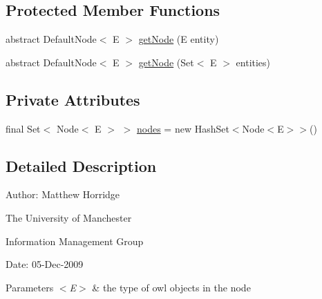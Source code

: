 \subsection*{Protected Member Functions}
\begin{DoxyCompactItemize}
\item 
abstract Default\-Node$<$ E $>$ \hyperlink{classorg_1_1semanticweb_1_1owlapi_1_1reasoner_1_1impl_1_1_default_node_set_3_01_e_01extends_01_o_w_l_object_01_4_a8f6b2885eac9afbc78bcea792bcda134}{get\-Node} (E entity)
\item 
abstract Default\-Node$<$ E $>$ \hyperlink{classorg_1_1semanticweb_1_1owlapi_1_1reasoner_1_1impl_1_1_default_node_set_3_01_e_01extends_01_o_w_l_object_01_4_ab78b1ad730667f015d372c462a029863}{get\-Node} (Set$<$ E $>$ entities)
\end{DoxyCompactItemize}
\subsection*{Private Attributes}
\begin{DoxyCompactItemize}
\item 
final Set$<$ Node$<$ E $>$ $>$ \hyperlink{classorg_1_1semanticweb_1_1owlapi_1_1reasoner_1_1impl_1_1_default_node_set_3_01_e_01extends_01_o_w_l_object_01_4_ab355a8f9ba4d122cad825fd36214893e}{nodes} = new Hash\-Set$<$Node$<$E$>$$>$()
\end{DoxyCompactItemize}


\subsection{Detailed Description}
Author\-: Matthew Horridge\par
 The University of Manchester\par
 Information Management Group\par
 Date\-: 05-\/\-Dec-\/2009 
\begin{DoxyParams}{Parameters}
{\em $<$\-E$>$} & the type of owl objects in the node \\
\hline
\end{DoxyParams}



